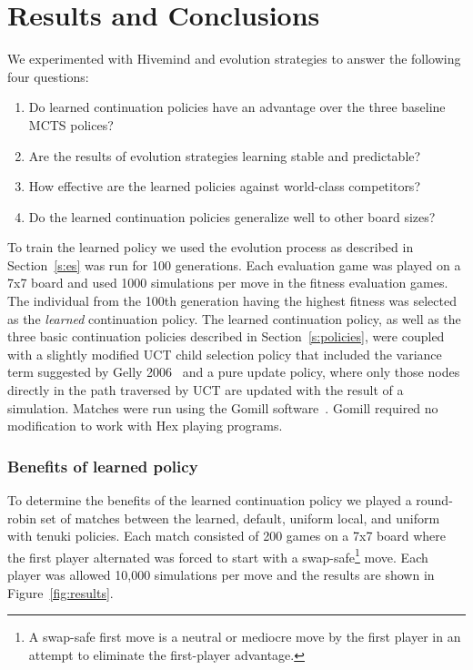 \documentclass{acm_proc_article-sp}
\begin{document}
\section{Results and Conclusions}\label{results}

We experimented with Hivemind and evolution strategies to answer the following four questions:
\begin{enumerate}
\item Do learned continuation policies have an advantage over the three baseline MCTS polices?
\item Are the results of evolution strategies learning stable and predictable?
\item How effective are the learned policies against world-class competitors?
\item Do the learned continuation policies generalize well to other board sizes?
\end{enumerate}

To train the learned policy we used the evolution process as described in Section~\ref{s:es} was run for 100 generations.  
Each evaluation game was played on a 7x7 board and used 1000 simulations per move in the fitness evaluation games. 
The individual from the 100th generation having the highest fitness was selected as the \emph{learned} continuation policy.
The learned continuation policy, as well as the three basic continuation policies described in Section~\ref{s:policies}, were coupled with
a slightly modified UCT child selection policy that included the variance term suggested by Gelly 2006~\cite{gelly2006exploration} and a
pure update policy, where only those nodes directly in the path traversed by UCT are updated with the result of a simulation.
Matches were run using the Gomill software~\cite{gomill}. 
Gomill required no modification to work with Hex playing programs.  

\subsubsection*{Benefits of learned policy}
To determine the benefits of the learned continuation policy we played a round-robin set of matches between the learned, 
default, uniform local, and uniform with tenuki policies.
Each match consisted of 200 games on a 7x7 board where the first player alternated was forced to start with a
swap-safe\footnote{A swap-safe first move is a neutral or mediocre move by the first player in an attempt to eliminate the first-player advantage.}
move.
Each player was allowed 10,000 simulations per move and the results are shown in Figure~\ref{fig:results}.
\end{document}
